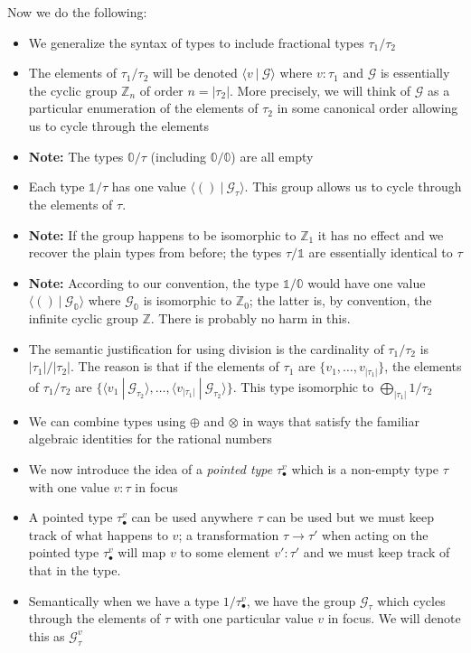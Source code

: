 \documentclass{article}
\newcommand{\zt}{\mathbb{0}}
\newcommand{\ot}{\mathbb{1}}
\newcommand{\G}{\mathcal{G}}
\newcommand{\fv}[2]{\langle #1 ~|~ #2 \rangle}
\newcommand{\Z}{\mathbb{Z}}
\newcommand{\pt}[2]{#1_{\bullet}^{#2}}
\begin{document}
Now we do the following:
\begin{itemize}
\item We generalize the syntax of types to include fractional types $\tau_1/\tau_2$ 
\item The elements of $\tau_1/\tau_2$ will be denoted $\fv{v}{\G}$ where $v : \tau_1$ and $\G$ is essentially the cyclic group $\Z_n$ of order $n=|\tau_2|$. More precisely, we will think of $\G$ as a particular enumeration of the elements of $\tau_2$ in some canonical order allowing us to cycle through the elements
\item \textbf{Note:} The types $\zt/\tau$ (including $\zt/\zt$) are all empty
\item Each type $\ot/\tau$ has one value $\fv{()}{\G_\tau}$. This group allows us to cycle through the elements of $\tau$.
\item \textbf{Note:} If the group happens to be isomorphic to $\Z_1$ it has no effect and we recover the plain types from before; the types $\tau/\ot$ are essentially identical to $\tau$
\item \textbf{Note:} According to our convention, the type $\ot/\zt$ would have one value $\fv{()}{\G_\zt}$ where $\G_\zt$ is isomorphic to $\Z_0$; the latter is, by convention, the infinite cyclic group $\Z$. There is probably no harm in this.
\item The semantic justification for using division is the cardinality of $\tau_1/\tau_2$ is $|\tau_1|/|\tau_2|$. The reason is that if the elements of $\tau_1$ are $\{v_1,\ldots,v_{|\tau_1|}\}$, the elements of $\tau_1/\tau_2$ are $\{ \fv{v_1}{\G_{\tau_2}}, \ldots, \fv{v_{|\tau_1|}}{\G_{\tau_2}} \}$. This type isomorphic to $\bigoplus_{|\tau_1|} 1/\tau_2$
\item We can combine types using $\oplus$ and $\otimes$ in ways that satisfy the familiar algebraic identities
for the rational numbers
\item We now introduce the idea of a \emph{pointed type} $\pt{\tau}{v}$ which is a non-empty type $\tau$ with one value $v : \tau$ in focus
\item A pointed type $\pt{\tau}{v}$ can be used anywhere $\tau$ can be used but we must keep track of what happens to $v$; a transformation $\tau \rightarrow \tau'$ when acting on the pointed type $\pt{\tau}{v}$ will map $v$ to some element $v' : \tau'$ and we must keep track of that in the type.
\item Semantically when we have a type $1/\pt{\tau}{v}$, we have the group $\G_\tau$ which cycles through the elements of $\tau$ with one particular value $v$ in focus. We will denote this as $\G_\tau^v$

\end{itemize}
\end{document}
